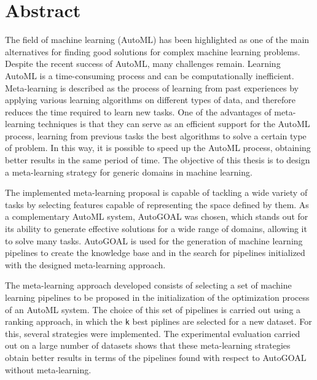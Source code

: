 \section*{Abstract}

The field of machine learning (AutoML) has been highlighted as one of the main alternatives for finding good solutions for complex machine learning problems. Despite the recent success of AutoML, many challenges remain. Learning AutoML is a time-consuming process and can be computationally inefficient. Meta-learning is described as the process of learning from past experiences by applying various learning algorithms on different types of data, and therefore reduces the time required to learn new tasks. One of the advantages of meta-learning techniques is that they can serve as an efficient support for the AutoML process, learning from previous tasks the best algorithms to solve a certain type of problem. In this way, it is possible to speed up the AutoML process, obtaining better results in the same period of time. The objective of this thesis is to design a meta-learning strategy for generic domains in machine learning.

The implemented meta-learning proposal is capable of tackling a wide variety of tasks by selecting features capable of representing the space defined by them.
As a complementary AutoML system, AutoGOAL was chosen, which stands out for its ability to generate effective solutions for a wide range of domains, allowing it to solve many tasks. AutoGOAL is used for the generation of machine learning pipelines to create the knowledge base and in the search for pipelines initialized with the designed meta-learning approach. %

The meta-learning approach developed consists of selecting a set of machine learning pipelines to be proposed in the initialization of the optimization process of an AutoML system. The choice of this set of pipelines is carried out using a ranking approach, in which the \texttt{k} best piplines are selected for a new dataset. For this, several strategies were implemented. The experimental evaluation carried out on a large number of datasets shows that these meta-learning strategies obtain better results in terms of the pipelines found with respect to AutoGOAL without meta-learning.

